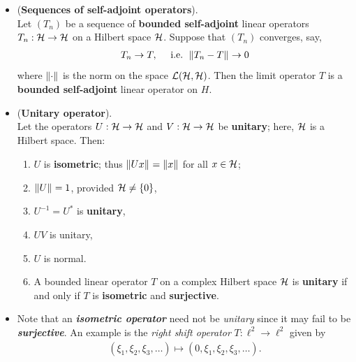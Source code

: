 \documentclass[11pt]{article}
\begin{document}
\begin{itemize}
\item \begin{proposition} (\textbf{Sequences of self-adjoint operators}). \citep{kreyszig1989introductory}\\
 Let $(T_n)$ be a sequence of \textbf{bounded self-adjoint} linear operators $T_n: {\mathcal H} \rightarrow {\mathcal H}$ on a Hilbert space ${\mathcal H}$. Suppose that $(T_n)$ converges, say,
 \begin{align*}
 T_n \rightarrow T, \quad \text{ i.e. } \left\|T_n - T\right\|_{} \rightarrow 0
 \end{align*}
where $\left\|\cdot\right\|_{}$ is the norm on the space ${\mathcal L}({\mathcal H}, {\mathcal H})$. Then the limit operator $T$ is a \textbf{bounded self-adjoint} linear operator on $H$.
\end{proposition}

\item \begin{proposition} (\textbf{Unitary operator}). \citep{kreyszig1989introductory}\\
Let the operators $U: {\mathcal H} \rightarrow {\mathcal H}$ and $V: {\mathcal H} \rightarrow {\mathcal H}$ be \textbf{unitary}; here, ${\mathcal H}$ is a Hilbert space. Then:
\begin{enumerate}
\item $U$ is \textbf{isometric}; thus $\left\|Ux\right\|_{} = \left\|x\right\|_{}$ for all $x \in {\mathcal H}$;
\item $\left\|U\right\|_{}= 1$, provided ${\mathcal H} \neq \{0\}$,
\item $U^{-1}= U^{*}$ is \textbf{unitary},
\item $UV$ is unitary,
\item $U$ is normal.
\item A bounded linear operator $T$ on a complex Hilbert space ${\mathcal H}$ is \textbf{unitary} if and only if $T$ is \textbf{isometric} and \textbf{surjective}.
\end{enumerate}
\end{proposition}

\item \begin{remark}
Note that an \emph{\textbf{isometric operator}} need not be \emph{unitary} since it may fail to be \emph{\textbf{surjective}}. An example is the \emph{right shift operator} $T: \ell^2 \rightarrow \ell^2$ given by
\begin{align*}
(\xi_1, \xi_2, \xi_3, \ldots) \mapsto (0, \xi_1, \xi_2, \xi_3, \ldots).
\end{align*}
\end{remark}
\end{itemize}
\newpage


\end{document}
